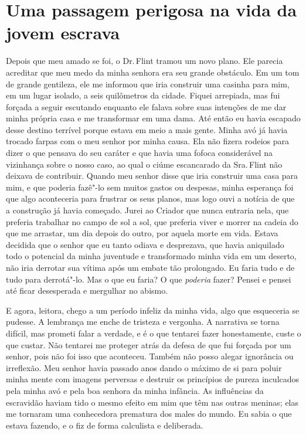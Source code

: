 \chapter*{Uma passagem perigosa na vida da jovem escrava}

Depois que meu amado se foi, o Dr.\,Flint tramou um novo plano. Ele parecia acreditar que meu medo da minha
senhora era seu grande obstáculo. Em um tom de grande gentileza, ele me
informou que iria construir uma casinha para mim, em um lugar isolado, a
seis quilômetros da cidade. Fiquei arrepiada, mas fui forçada a seguir
escutando enquanto ele falava sobre suas intenções de me dar minha
própria casa e me transformar em uma dama. Até então eu havia escapado
desse destino terrível porque estava em meio a mais gente. Minha avó já
havia trocado farpas com o meu senhor por minha causa. Ela não fizera
rodeios para dizer o que pensava do seu caráter e que havia uma fofoca
considerável na vizinhança sobre o nosso caso, ao qual o ciúme
escancarado da Sra.\,Flint não deixava de contribuir. Quando meu senhor
disse que iria construir uma casa para mim, e que poderia fazê"-lo sem
muitos gastos ou despesas, minha esperança foi que algo aconteceria para
frustrar os seus planos, mas logo ouvi a notícia de que a construção já
havia começado. Jurei ao Criador que nunca entraria nela, que preferia
trabalhar no campo de sol a sol, que preferia viver e morrer na cadeia
do que me arrastar, um dia depois do outro, por aquela morte em vida.
Estava decidida que o senhor que eu tanto odiava e desprezava, que havia
aniquilado todo o potencial da minha juventude e transformado minha vida
em um deserto, não iria derrotar sua vítima após um embate tão
prolongado. Eu faria tudo e de tudo para derrotá"-lo. Mas o que eu faria?
O que \emph{poderia} fazer? Pensei e pensei até ficar desesperada e
mergulhar no abismo.

E agora, leitora, chego a um período
infeliz da minha vida, algo que esqueceria se pudesse. A lembrança me
enche de tristeza e vergonha. A narrativa se torna difícil, mas prometi
falar a verdade, e é o que tentarei fazer honestamente, custe o que
custar. Não tentarei me proteger atrás da defesa de que fui forçada por
um senhor, pois não foi isso que aconteceu.
Também não posso alegar ignorância
ou irreflexão. Meu senhor havia passado anos dando o máximo de si para
poluir minha mente com imagens perversas e destruir os princípios de
pureza inculcados pela minha avó e pela boa senhora da minha infância.
As influências da escravidão haviam tido o mesmo efeito em mim que têm
nas outras meninas; elas me tornaram uma conhecedora prematura dos males
do mundo. Eu sabia o que estava fazendo, e o fiz de forma calculista e
deliberada.

